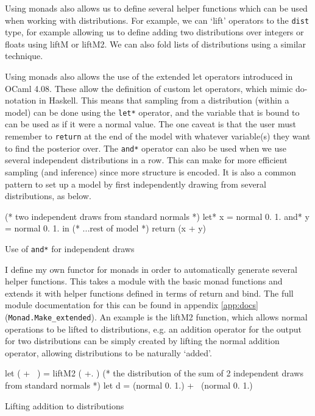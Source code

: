 Using monads also allows us to define several helper functions which can be used when working with distributions. For example, we can `lift' operators to the \texttt{dist} type, for example allowing us to define adding two distributions over integers or floats using liftM or liftM2. We can also fold lists of distributions using a similar technique.
	
Using monads also allows the use of the extended let operators introduced in OCaml 4.08. These allow the definition of custom let operators, which mimic do-notation in Haskell. This means that sampling from a distribution (within a model) can be done using the \texttt{let*} operator, and the variable that is bound to can be used as if it were a normal value. The one caveat is that the user must remember to \texttt{return} at the end of the model with whatever variable(s) they want to find the posterior over. The \texttt{and*} operator can also be used when we use several independent distributions in a row. This can make for more efficient sampling (and inference) since more structure is encoded. It is also a common pattern to set up a model by first independently drawing from several distributions, as below.
\begin{listing}
\begin{ocamlcode-in}
(* two independent draws from standard normals *)
let* x = normal 0. 1.
and* y = normal 0. 1. in
(* ...rest of model  *)
return (x + y)
\end{ocamlcode-in}
\caption{Use of \texttt{and*} for independent draws}
\end{listing}
			
I define my own functor for monads in order to automatically generate several helper functions. This takes a module with the basic monad functions and extends it with helper functions defined in terms of return and bind. The full module documentation for this can be found in appendix \ref{app:docs} (\texttt{Monad.Make\_extended}). An example is the liftM2 function, which allows normal operations to be lifted to distributions, e.g. an addition operator for the output for two distributions can be simply created by lifting the normal addition operator, allowing distributions to be naturally `added'.
	
\begin{listing}
\begin{ocamlcode-in}
let ( +~ ) = liftM2 ( +. )
(* the distribution of the sum of 2 independent draws from standard normals *)
let d = (normal 0. 1.) +~ (normal 0. 1.)
\end{ocamlcode-in}
\caption{Lifting addition to distributions}
\end{listing}
	
